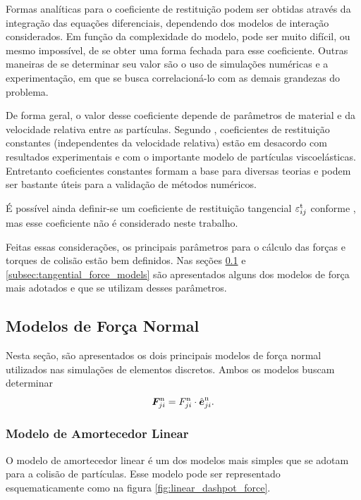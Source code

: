 Formas analíticas para o coeficiente de restituição podem ser obtidas através da integração das equações diferenciais, dependendo dos modelos de interação considerados. Em função da complexidade do modelo, pode ser muito difícil, ou mesmo impossível, de se obter uma forma fechada para esse coeficiente. Outras maneiras de se determinar seu valor são o uso de simulações numéricas e a experimentação, em que se busca correlacioná-lo com as demais grandezas do problema.

De forma geral, o valor desse coeficiente depende de parâmetros de material e da velocidade relativa entre as partículas. Segundo , coeficientes de restituição constantes (independentes da velocidade relativa) estão em desacordo com resultados experimentais e com o importante modelo de partículas viscoelásticas. Entretanto coeficientes constantes formam a base para diversas teorias e podem ser bastante úteis para a validação de métodos numéricos.

É possível ainda definir-se um coeficiente de restituição tangencial \({\varepsilon}_{i j}^{\text{t}}\) conforme , mas esse coeficiente não é considerado neste trabalho.

Feitas essas considerações, os principais parâmetros para o cálculo das forças e torques de colisão estão bem definidos. Nas seções \ref{subsec:normal_force_models} e \ref{subsec:tangential_force_models} são apresentados alguns dos modelos de força mais adotados e que se utilizam desses parâmetros.

\subsection{Modelos de Força Normal} \label{subsec:normal_force_models}

Nesta seção, são apresentados os dois principais modelos de força normal utilizados nas simulações de elementos discretos. Ambos os modelos buscam determinar
\begin{equation*}
	{\bm{F}}_{j i}^{\text{n}} = {F}_{j i}^{\text{n}}\cdot{\hat{\bm{e}}}_{j i}^{\text{n}}.
\end{equation*}

\subsubsection*{Modelo de Amortecedor Linear}

O modelo de amortecedor linear é um dos modelos mais simples que se adotam para a colisão de partículas. Esse modelo pode ser representado esquematicamente como na figura \ref{fig:linear_dashpot_force}.

